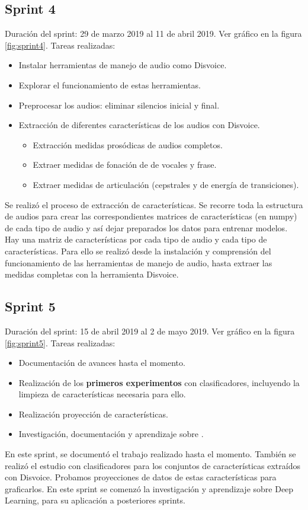 \subsection{Sprint 4}
Duración del sprint: 29 de marzo 2019 al 11 de abril 2019. Ver gráfico  en la figura \ref{fig:sprint4}.
Tareas realizadas:
\begin{itemize}
\item Instalar herramientas de manejo de audio como Disvoice.
\item Explorar el funcionamiento de estas herramientas.
\item Preprocesar los audios: eliminar silencios inicial y final.
\item Extracción de diferentes características de los audios con Disvoice.
	\begin{itemize}
    \item Extracción medidas prosódicas de audios completos.
	\item Extraer medidas de fonación de  de vocales y frase.
	\item Extraer medidas de articulación (cepstrales y de energía de transiciones).
	\end{itemize}
\end{itemize}
Se realizó el proceso de extracción de características. Se recorre toda la estructura de audios para crear las correspondientes matrices de características (en numpy) de cada tipo de audio y así dejar preparados los datos para entrenar modelos. Hay una matriz de características por cada tipo de audio y cada tipo de características. Para ello se realizó desde la instalación y comprensión del funcionamiento de las herramientas de manejo de audio, hasta extraer las medidas completas con la herramienta Disvoice.

\subsection{Sprint 5}
Duración del sprint: 15 de abril 2019 al 2 de mayo 2019. Ver gráfico  en la figura \ref{fig:sprint5}.
Tareas realizadas:
\begin{itemize}
\item Documentación de avances hasta el momento.
\item Realización de los \textbf{primeros experimentos} con clasificadores, incluyendo la limpieza de características necesaria para ello.
\item Realización proyección de características.
\item Investigación, documentación y aprendizaje sobre .
\end{itemize}
En este sprint, se documentó el trabajo realizado hasta el momento. También se realizó el estudio con clasificadores para los conjuntos de características extraídos con Disvoice. Probamos proyecciones de datos de estas características para graficarlos. En este sprint se comenzó la investigación y aprendizaje sobre Deep Learning, para su aplicación a posteriores sprints.


